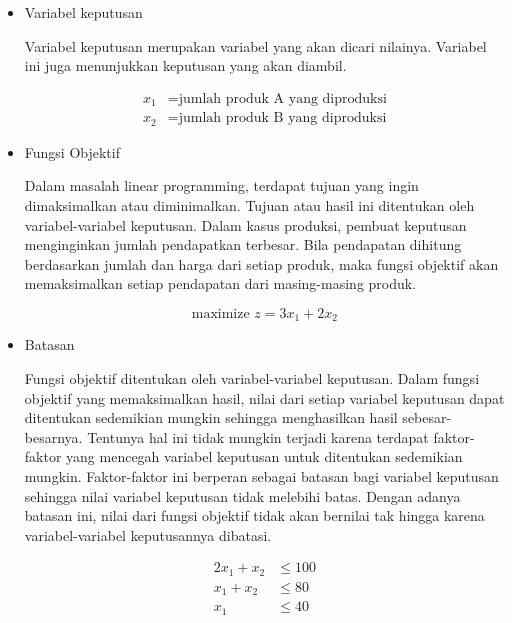 \begin{itemize}
	\item Variabel keputusan
	
		Variabel keputusan merupakan variabel yang akan dicari nilainya. Variabel ini juga menunjukkan keputusan yang akan diambil.
		
		\begin{equation*}
			\begin{split}
				x_1 &= \text{jumlah produk A yang diproduksi} \\
    			x_2 &= \text{jumlah produk B yang diproduksi}
			\end{split}
		\end{equation*}
		
	\item Fungsi Objektif
	
		Dalam masalah linear programming, terdapat tujuan yang ingin dimaksimalkan atau diminimalkan. Tujuan atau hasil ini ditentukan oleh variabel-variabel keputusan. Dalam kasus produksi, pembuat keputusan menginginkan jumlah pendapatkan terbesar. Bila pendapatan dihitung berdasarkan jumlah dan harga dari setiap produk, maka fungsi objektif akan memaksimalkan setiap pendapatan dari masing-masing produk.
		
		\begin{equation*}
			\text{maximize } z = 3x_1 + 2x_2
		\end{equation*}

	\item Batasan
	
		Fungsi objektif ditentukan oleh variabel-variabel keputusan. Dalam fungsi objektif yang memaksimalkan hasil, nilai dari setiap variabel keputusan dapat ditentukan sedemikian mungkin sehingga menghasilkan hasil sebesar-besarnya. Tentunya hal ini tidak mungkin terjadi karena terdapat faktor-faktor yang mencegah variabel keputusan untuk ditentukan sedemikian mungkin. Faktor-faktor ini berperan sebagai batasan bagi variabel keputusan sehingga nilai variabel keputusan tidak melebihi batas. Dengan adanya batasan ini, nilai dari fungsi objektif tidak akan bernilai tak hingga karena variabel-variabel keputusannya dibatasi.
		
		\begin{equation*}
			\begin{split}
				2x_1 + x_2 &\leq 100 \\
    			x_1 + x_2 &\leq 80 \\
    			x_1 &\leq 40
			\end{split}
		\end{equation*}
		

\end{itemize}
